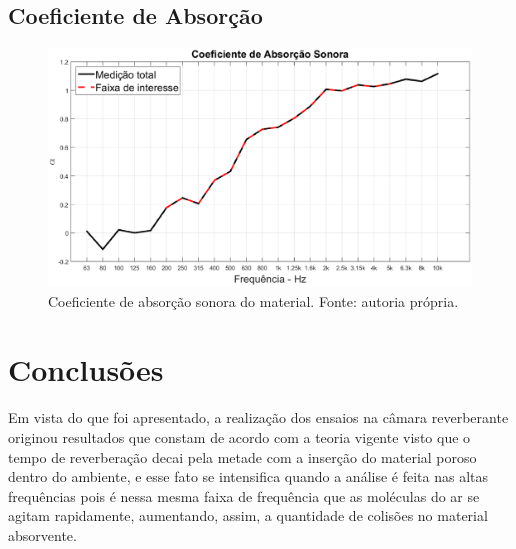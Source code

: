 \section{Coeficiente de Absorção}
\begin{figure}[h!]
    \centering
    \includegraphics[width=1.2\textwidth]{imagem2.eps}
    \caption{Coeficiente de absorção sonora do material. Fonte: autoria própria.}
    \label{figura_2}
\end{figure}


\chapter{Conclusões}\label{conclusoes}

Em vista do que foi apresentado, a realização dos ensaios na câmara reverberante originou resultados que constam de acordo com a teoria vigente visto que o tempo de reverberação decai pela metade com a inserção do material poroso dentro do ambiente, e esse fato se intensifica quando a análise é feita nas altas frequências pois é nessa mesma faixa de frequência que as moléculas do ar se agitam rapidamente, aumentando, assim, a quantidade de colisões no material absorvente.
